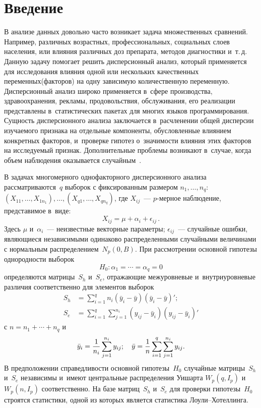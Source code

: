 


\thispagestyle{headings}

\begin{multicols}{2}

\label{st\stat}


\section{Введение}

В анализе данных довольно часто возникает задача множественных сравнений. 
Например, различных возрастных, профессиональных, социальных слоев населения, 
или влияния различных доз препарата, методов диагностики и~т.\,д. Данную задачу 
помогает решить дисперсионный анализ, который применяется для исследования 
влияния одной или нескольких качественных переменных\linebreak (факторов) на одну 
зависимую количественную переменную. Дисперсионный  анализ широко применяется 
в~сфере производства, здравоохранения, рекла\-мы, продовольствия, обслуживания, его 
реализации представлены в~статистических пакетах для многих языков 
программирования. Сущность дисперсионного анализа заключается в~расчленении 
общей дисперсии изучаемого признака на отдельные компоненты, обусловленные 
влиянием конкретных факторов, и~проверке гипотез о~зна\-чи\-мости влияния этих 
факторов на исследуемый признак. Дополнительные проб\-ле\-мы возникают в~случае, 
когда объем наблюдения оказывается случайным~\cite{BenKorGal13}.

 В задачах многомерного однофакторного дисперсионного анализа рассматриваются~$q$ 
 выборок с фиксированным размером $n_1, \ldots, n_q$: $(X_{1 1},\ldots, X_{1 
n_1}), \ldots, (X_{q 1},\ldots, X_{q n_q})$, где $X_{i j}$~--- \mbox{$p$-мер}\-ное 
наблюдение, представимое в~виде:
$$
X_{i j} = \mu + \alpha_i + \epsilon_{ij}\,. 
$$
Здесь $\mu$ и~$\alpha_i$~--- неизвестные векторные параметры; $\epsilon_{ij}$~--- 
случайные ошибки, явля\-ющи\-еся независимыми одинаково распределенными случайными 
величинами с нормальным распределением~$N_p(0,B)$. При рассмотрении основной 
гипотезы од\-но\-род\-ности выборок
$$
H_0: \alpha_1 = \cdots = \alpha_q = 0
$$
определяются матрицы~$S_h$ и~$S_e$, отражающие межуровневые и~внутриуровневые 
различия соответственно для элементов выборок
\begin{align*}
S_h &= \sum\limits_{i=1}^{q}n_i(\bar{y}_i - \bar{y})(\bar{y}_i - \bar{y})'; \\
 S_e &= 
\sum\limits_{i=1}^{q} \sum\limits_{j=1}^{n_i}(y_{ij} - \bar{y}_i)(y_{ij} - \bar{y}_i)'
\end{align*}
с $n = n_1 + \cdots + n_q$ и~$$
\bar{y}_i = \displaystyle\frac{\displaystyle 1\mathstrut}{\displaystyle n_i\mathstrut}\sum\limits_{j=1}^{n_i}y_{ij}; \quad \bar{y} = 
\displaystyle\frac{\displaystyle 1\mathstrut}{\displaystyle n\mathstrut}\sum\limits_{i=1}^{q}\sum\limits_{j=1}^{n_i}y_{ij}.
$$
В предположении справедливости основной гипотезы~$H_0$ случайные матрицы~$S_h$ 
и~$S_e$ независимы и~имеют центральные распределения Уишарта $W_p(q, I_p)$ 
и~$W_p(n, I_p)$ соответственно. На базе мат\-риц~$S_h$ и~$S_e$ для проверки гипотезы~$H_0$ 
строятся статистики, одной из которых является статистика Лоу\-ли--Хо\-тел\-линга.


\end{multicols}
